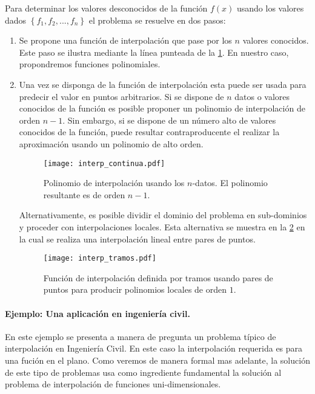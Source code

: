 Para determinar los valores desconocidos de la función $f(x)$ usando los valores dados $\left\{f_1,f_2,...,f_n\right\}$ el problema se resuelve en dos pasos:

\begin{enumerate}
	\item  Se propone una función de interpolación que pase por los $n$ valores conocidos. Este paso se ilustra mediante la línea punteada de la \cref{fig:interp_continua}. En nuestro caso, propondremos funciones polinomiales.
		
	\item Una vez se disponga de la función de interpolación esta puede ser usada para predecir el valor en puntos arbitrarios. Si se dispone de $n$ datos o valores conocidos de la función es posible proponer un polinomio de interpolación de orden $n-1$. Sin embargo, si se dispone de un número alto de valores conocidos de la función, puede resultar contraproducente el realizar la aproximación usando un polinomio de alto orden.
	
	
		\begin{figure}[H]
		\centering
		\texttt{[image: interp\_continua.pdf]}
		\caption{Polinomio de interpolación usando los $n$-datos. El polinomio resultante es de orden $n-1$.}
		\label{fig:interp_continua}
	\end{figure}
	
	Alternativamente, es posible dividir el dominio del problema en sub-dominios y proceder con interpolaciones locales. Esta alternativa se muestra en la \cref{fig:interp_tramos} en la cual se realiza una interpolación lineal entre pares de puntos.
	\begin{figure}[h]
		\centering
		\texttt{[image: interp\_tramos.pdf]}
		\caption{Función de interpolación  definida por tramos usando pares de puntos para producir polinomios locales de orden $1$.}
		\label{fig:interp_tramos}
	\end{figure}
	
\end{enumerate}

\paragraph*{Ejemplo: Una aplicación en ingeniería civil.}
En este ejemplo se presenta a manera de pregunta un problema típico de interpolación en Ingeniería Civil. En este caso la interpolación requerida es para una fución en el plano. Como veremos de manera formal mas adelante, la solución de este tipo de problemas usa como ingrediente fundamental la solución al problema de interpolación de funciones uni-dimensionales.

